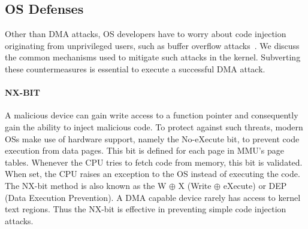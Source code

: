 
        



\subsection{OS Defenses}

Other than DMA attacks, OS developers have to worry about code injection originating from unprivileged users, such as buffer overflow attacks~\cite{nx, kalsr}.
We discuss the common mechanisms used to mitigate such attacks in the kernel. Subverting these countermeasures is essential to execute a successful DMA attack.

\paragraph{NX-BIT}\label{sec:nx-bit}

A malicious device can gain write access to a function pointer and consequently gain the ability to inject malicious code. 
To protect against such threats, modern OSs make use of hardware support, namely the No-eXecute bit, to prevent code execution from data pages. This bit is defined for each page in MMU’s page tables. Whenever the CPU tries to fetch code from memory, this bit is validated. When set, the CPU raises an exception to the OS instead of executing the code. The NX-bit method is also known as the W $\oplus$ X (Write $\oplus$ eXecute) or DEP (Data Execution Prevention). 
A DMA capable device rarely has access to kernel text regions. Thus the NX-bit is effective in preventing simple code injection attacks.

